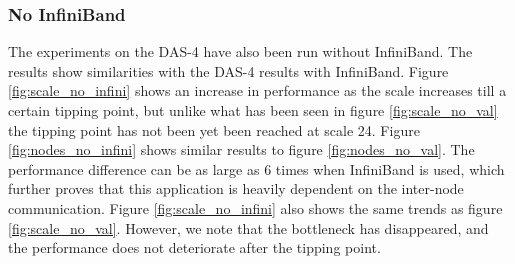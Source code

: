 \subsubsection{No InfiniBand}
\label{res:no_infini}
The experiments on the DAS-4 have also been run without InfiniBand. The results show similarities with the DAS-4 results with InfiniBand. Figure \ref{fig:scale_no_infini} shows an increase in performance as the scale increases till a certain tipping point, but unlike what has been seen in figure \ref{fig:scale_no_val} the tipping point has not been yet been reached at scale 24.
Figure \ref{fig:nodes_no_infini} shows similar results to figure \ref{fig:nodes_no_val}. The performance difference can be as large as 6 times when InfiniBand is used, which further proves that this application is heavily dependent on the inter-node communication.
Figure \ref{fig:scale_no_infini} also shows the same trends as figure \ref{fig:scale_no_val}. However, we note that the bottleneck has disappeared, and the performance does not deteriorate after the tipping point. 
 
